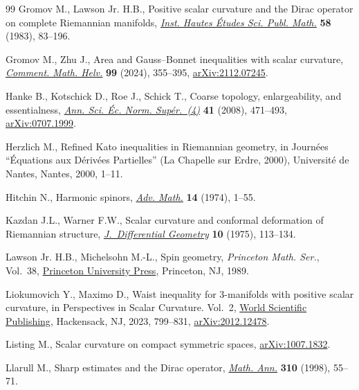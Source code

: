 \documentclass[10pt,a4paper]{amsart}
\numberwithin{equation}{section}
\begin{document}
\begin{thebibliography}{99}
Gromov M., Lawson Jr. H.B., Positive scalar curvature and the {D}irac operator
  on complete {R}iemannian manifolds, \href{https://doi.org/10.1007/BF02953774}{\textit{Inst. Hautes \'Etudes Sci. Publ.
  Math.}} \textbf{58} (1983), 83--196.

Gromov M., Zhu J., Area and {G}auss--{B}onnet inequalities with scalar
  curvature, \href{https://doi.org/10.4171/cmh/570}{\textit{Comment. Math. Helv.}} \textbf{99} (2024), 355--395,
  \href{https://arxiv.org/abs/2112.07245}{arXiv:2112.07245}.

Hanke B., Kotschick D., Roe J., Schick T., Coarse topology, enlargeability, and
  essentialness, \href{https://doi.org/10.24033/asens.2073}{\textit{Ann. Sci. \'Ec. Norm. Sup\'er.~(4)}} \textbf{41}
  (2008), 471--493, \href{https://arxiv.org/abs/0707.1999}{arXiv:0707.1999}.

Herzlich M., Refined {K}ato inequalities in {R}iemannian geometry, in
  Journ\'ees ``\'Equations aux {D}\'eriv\'ees {P}artielles'' ({L}a {C}hapelle
  sur {E}rdre, 2000), Universit\'e de Nantes, Nantes, 2000, 1--11.

Hitchin N., Harmonic spinors, \href{https://doi.org/10.1016/0001-8708(74)90021-8}{\textit{Adv. Math.}} \textbf{14} (1974), 1--55.

Kazdan J.L., Warner F.W., Scalar curvature and conformal deformation of
  {R}iemannian structure, \href{https://doi.org/10.4310/jdg/1214432678}{\textit{J.~Differential Geometry}} \textbf{10} (1975),
  113--134.

Lawson Jr. H.B., Michelsohn M.-L., Spin geometry, \textit{Princeton Math. Ser.},
  Vol.~38, \href{https://doi.org/10.1515/9781400883912}{Princeton University Press}, Princeton, NJ, 1989.

Liokumovich Y., Maximo D., Waist inequality for 3-manifolds with positive
  scalar curvature, in Perspectives in {S}calar {C}urvature. {V}ol.~2, \href{https://doi.org/10.1142/9789811273230_0022}{World
  Scientific Publishing}, Hackensack, NJ, 2023, 799--831, \href{https://arxiv.org/abs/2012.12478}{arXiv:2012.12478}.

Listing M., Scalar curvature on compact symmetric spaces, \href{https://arxiv.org/abs/1007.1832}{arXiv:1007.1832}.

Llarull M., Sharp estimates and the {D}irac operator, \href{https://doi.org/10.1007/s002080050136}{\textit{Math. Ann.}}
  \textbf{310} (1998), 55--71.


\end{thebibliography}
\end{document}
